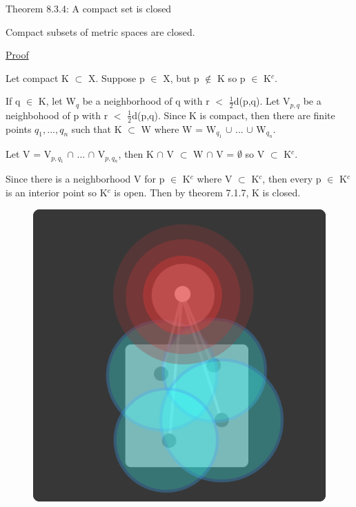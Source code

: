 { \color{red} Theorem 8.3.4: A compact set is closed } 

	\begin{adjustbox}{minipage=14cm, right, vspace=0.1cm 0cm}
		Compact subsets of metric spaces are closed.
	\end{adjustbox}

{ \color{magenta} \underline{Proof} } 

	Let compact K $\subset$ X.
	Suppose p $\in$ X, but p $\not \in$ K so p $\in$ K$^c$.

	If q $\in$ K, let W$_q$ be a neighborhood of q with
	r $<$ $\frac{1}{2}$d(p,q).
	Let V$_{p,q}$ be a neighbohood of p with r $<$ $\frac{1}{2}$d(p,q).
	Since K is compact, then there are finite points $q_1, ... , q_n$
	such that K $\subset$ W where W = W$_{q_1}$ $\cup$ ... $\cup$ W$_{q_n}$.

	Let V = V$_{p,q_1}$ $\cap$ ... $\cap$ V$_{p,q_n}$, then
	K $\cap$ V $\subset$ W $\cap$ V = $\emptyset$ so V $\subset$ K$^c$.

	Since there is a neighborhood V for p $\in$ K$^c$ where V $\subset$ K$^c$,
	then every p $\in$ K$^c$ is an interior point so K$^c$ is open.
	Then by {\color{red} theorem 7.1.7}, K is closed. \\

\newpage

\begin{figure}[h]
	\centering
	\includegraphics[scale=0.35]{Images/8.3.4.png}
\end{figure}

